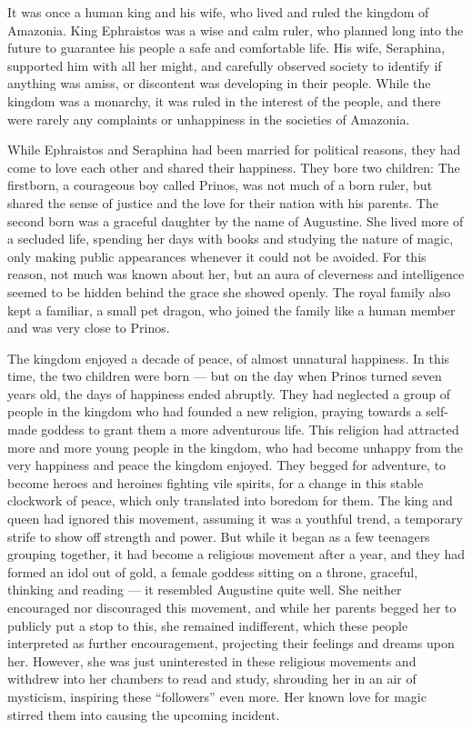 \fancybreaker{}

It was once a human king and his wife, who lived and ruled the kingdom of Amazonia. King Ephraistos was a wise and calm ruler, who planned long into the future to guarantee his people a safe and comfortable life. His wife, Seraphina, supported him with all her might, and carefully observed society to identify if anything was amiss, or discontent was developing in their people. While the kingdom was a monarchy, it was ruled in the interest of the people, and there were rarely any complaints or unhappiness in the societies of Amazonia.

While Ephraistos and Seraphina had been married for political reasons, they had come to love each other and shared their happiness. They bore two children: The firstborn, a courageous boy called Prinos, was not much of a born ruler, but shared the sense of justice and the love for their nation with his parents. The second born was a graceful daughter by the name of Augustine. She lived more of a secluded life, spending her days with books and studying the nature of magic, only making public appearances whenever it could not be avoided. For this reason, not much was known about her, but an aura of cleverness and intelligence seemed to be hidden behind the grace she showed openly. The royal family also kept a familiar, a small pet dragon, who joined the family like a human member and was very close to Prinos.

The kingdom enjoyed a decade of peace, of almost unnatural happiness. In this time, the two children were born --- but on the day when Prinos turned seven years old, the days of happiness ended abruptly. They had neglected a group of people in the kingdom who had founded a new religion, praying towards a self-made goddess to grant them a more adventurous life. This religion had attracted more and more young people in the kingdom, who had become unhappy from the very happiness and peace the kingdom enjoyed. They begged for adventure, to become heroes and heroines fighting vile spirits, for a change in this stable clockwork of peace, which only translated into boredom for them. The king and queen had ignored this movement, assuming it was a youthful trend, a temporary strife to show off strength and power. But while it began as a few teenagers grouping together, it had become a religious movement after a year, and they had formed an idol out of gold, a female goddess sitting on a throne, graceful, thinking and reading --- it resembled Augustine quite well. She neither encouraged nor discouraged this movement, and while her parents begged her to publicly put a stop to this, she remained indifferent, which these people interpreted as further encouragement, projecting their feelings and dreams upon her. However, she was just uninterested in these religious movements and withdrew into her chambers to read and study, shrouding her in an air of mysticism, inspiring these \enquote{followers} even more. Her known love for magic stirred them into causing the upcoming incident.


